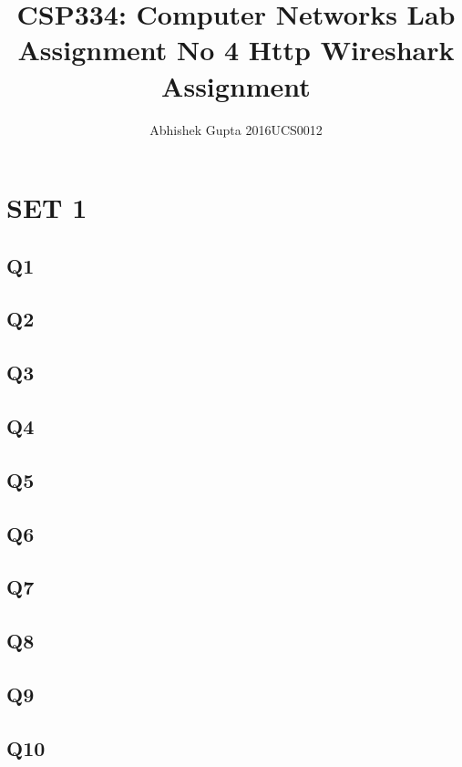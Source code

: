 \documentclass{article}
\title{CSP334: Computer Networks \linebreak
Lab Assignment No 4\linebreak
Http Wireshark Assignment}
\author{Abhishek Gupta  2016UCS0012}
\begin{document}
\maketitle

\section{SET 1}

\subsection{Q1}

\subsection{Q2}

\subsection{Q3}

\subsection{Q4}

\subsection{Q5}

\subsection{Q6}

\subsection{Q7}

\subsection{Q8}

\subsection{Q9}

\subsection{Q10}
\end{document}
